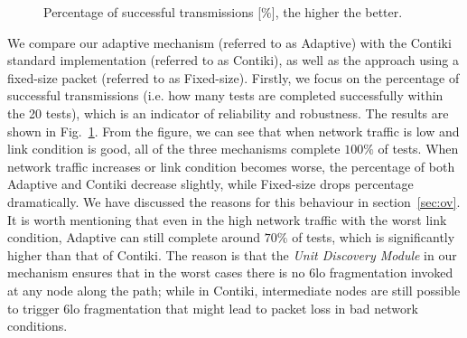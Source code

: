 \documentclass[runningheads,a4paper]{llncs}
\begin{document}
\begin{figure}
	\vspace{-10pt}
	\centering
	\caption{Percentage of successful transmissions [$\%$], the higher the better.}
	\label{fig:pct}
	\vspace{-10pt}
\end{figure}
We compare our adaptive mechanism (referred to as Adaptive) with the Contiki standard implementation (referred to as Contiki), as well as the approach using a fixed-size packet (referred to as Fixed-size). Firstly, we focus on the percentage of successful transmissions (i.e. how many tests are completed successfully within the 20 tests), which is an indicator of reliability and robustness. The results are shown in Fig.~\ref{fig:pct}. From the figure, we can see that when network traffic is low and link condition is good, all of the three mechanisms complete $100\%$ of tests. When network traffic increases or link condition becomes worse, the percentage of both Adaptive and Contiki decrease slightly, while Fixed-size drops percentage dramatically. We have discussed the reasons for this behaviour in section~\ref{sec:ov}. It is worth mentioning that even in the high network traffic with the worst link condition, Adaptive can still complete around $70\%$ of tests, which is significantly higher than that of Contiki. The reason is that the \emph{Unit Discovery Module} in our mechanism ensures that in the worst cases there is no 6lo fragmentation invoked at any node along the path; while in Contiki, intermediate nodes are still possible to trigger 6lo fragmentation that might lead to packet loss in bad network conditions.
\end{document}
